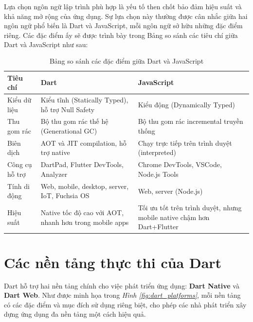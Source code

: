 \documentclass[../DoAn.tex]{subfiles}
\numberwithin{figure}{chapter}
\begin{document}
Lựa chọn ngôn ngữ lập trình phù hợp là yếu tố then chốt bảo đảm hiệu suất và khả năng mở rộng của ứng dụng. Sự lựa chọn này thường được cân nhắc giữa hai ngôn ngữ phổ biến là Dart và JavaScript, mỗi ngôn ngữ sở hữu những đặc điểm riêng. Các đặc điểm ấy sẽ được trình bày trong Bảng so sánh các tiêu chí giữa Dart và JavaScript như sau:
















\begin{table}[H]
\centering
\begin{tabular}{|>{\centering\arraybackslash}p{4.5cm}|>{\centering\arraybackslash}p{4.5cm}|>{\centering\arraybackslash}p{4.5cm}|}
\hline
\textbf{Tiêu chí} & \textbf{Dart} & \textbf{JavaScript} \\ \hline
Kiểu dữ liệu & Kiểu tĩnh (Statically Typed), hỗ trợ Null Safety & Kiểu động (Dynamically Typed) \\ \hline
Thu gom rác & Bộ thu gom rác thế hệ (Generational GC) & Bộ thu gom rác incremental truyền thống \\ \hline
Biên dịch & AOT và JIT compilation, hỗ trợ native & Chạy trực tiếp trên trình duyệt (interpreted) \\ \hline
Công cụ hỗ trợ & DartPad, Flutter DevTools, Analyzer & Chrome DevTools, VSCode, Node.js Tools \\ \hline
Tính di động & Web, mobile, desktop, server, IoT, Fuchsia OS & Web, server (Node.js) \\ \hline
Hiệu suất & Native tốc độ cao với AOT, nhanh hơn trong mobile apps & Tối ưu tốt trên trình duyệt, nhưng mobile native chậm hơn Dart+Flutter \\ \hline
\end{tabular}
\caption{Bảng so sánh các đặc điểm giữa Dart và JavaScript}
\label{tab:dart_vs_js}
\end{table}

\section{Các nền tảng thực thi của Dart}

Dart hỗ trợ hai nền tảng chính cho việc phát triển ứng dụng: \textbf{Dart Native} và \textbf{Dart Web}. Như được minh họa trong \textit{Hình \ref{fig:dart_platforms}}, mỗi nền tảng có các đặc điểm và mục đích sử dụng riêng biệt, cho phép các nhà phát triển xây dựng ứng dụng đa nền tảng một cách hiệu quả.
\end{document}
